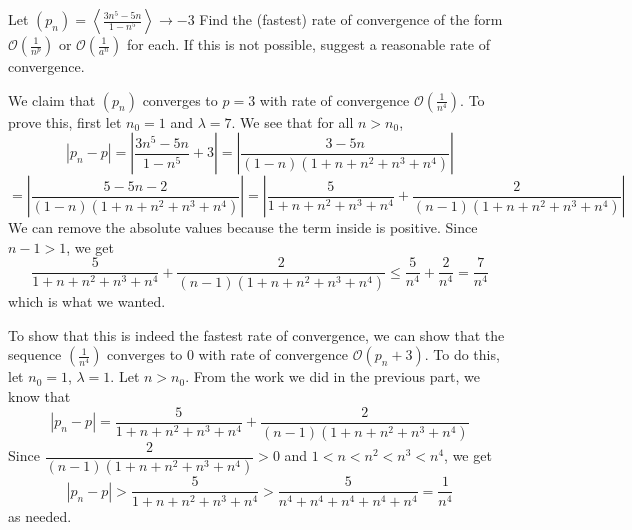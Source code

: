 \documentclass{article}
\theoremstyle{plain} %
\numberwithin{thm}{section} %
\theoremstyle{definition}
\begin{document}
    \newpage
    \begin{question}{5}
        Let \((p_n) = \left\langle \frac{3n^5 - 5n}{1 - n^5} \right\rangle \to -3\) Find the (fastest) rate of convergence of the form \(\mathcal{O}\left(\frac{1}{n^p}\right)\) or \(\mathcal{O}\left(\frac{1}{a^n}\right)\) for each. If this is not possible, suggest a reasonable rate of convergence.

        We claim that \((p_n)\) converges to \(p = 3\) with rate of convergence \(\mathcal{O} \left(\frac{1}{n^4}\right)\). To prove this, first let \(n_0 = 1\) and \(\lambda = 7\). We see that for all \(n > n_0\),
        \[
            |p_n - p| = \left\vert \frac{3n^5 - 5n}{1 - n^5} + 3 \right\vert = \left\vert \frac{3 - 5n}{(1 - n)(1 + n + n^2 + n^3 + n^4)} \right\vert
        \]
        \[
            = \left\vert \frac{5 - 5n - 2}{(1 - n)(1 + n + n^2 + n^3 + n^4)} \right\vert = \left\vert \frac{5}{1 + n + n^2 + n^3 + n^4} + \frac{2}{(n - 1)(1 + n + n^2 + n^3 + n^4)} \right\vert
        \]
        We can remove the absolute values because the term inside is positive. Since \(n - 1 > 1\), we get
        \[
            \frac{5}{1 + n + n^2 + n^3 + n^4} + \frac{2}{(n - 1)(1 + n + n^2 + n^3 + n^4)} \leq \frac{5}{n^4} + \frac{2}{n^4} = \frac{7}{n^4}
        \]
        which is what we wanted.

        To show that this is indeed the fastest rate of convergence, we can show that the sequence \(\left( \frac{1}{n^4} \right)\) converges to 0 with rate of convergence \(\mathcal{O} \left( p_n + 3 \right)\). To do this, let \(n_0 = 1\), \(\lambda = 1\). Let \(n > n_0\). From the work we did in the previous part, we know that
        \[
            |p_n - p| = \frac{5}{1 + n + n^2 + n^3 + n^4} + \frac{2}{(n - 1)(1 + n + n^2 + n^3 + n^4)}
        \]
        Since \(\dfrac{2}{(n-1)(1 + n + n^2 + n^3 + n^4)} > 0\) and \(1 < n < n^2 < n^3 < n^4\), we get
        \[
            |p_n - p| > \frac{5}{1 + n + n^2 + n^3 + n^4} > \frac{5}{n^4 + n^4 + n^4 + n^4 + n^4} = \frac{1}{n^4}
        \]
        as needed.
    \end{question}
    \newpage
\end{document}
